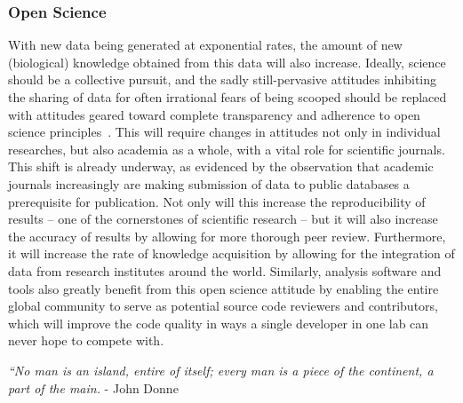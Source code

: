 \subsubsection{Open Science}
With new data being generated at exponential rates, the amount of new (biological) knowledge obtained from this data will also increase.
Ideally, science should be a collective pursuit, and the sadly still-pervasive attitudes inhibiting the sharing of data for often irrational fears of being scooped should be replaced with attitudes geared toward complete transparency and adherence to open science principles~\cite{nosek2015promoting}.
This will require changes in attitudes not only in individual researches, but also academia as a whole, with a vital role for scientific journals.
This shift is already underway, as evidenced by the observation that academic journals increasingly are making submission of data to public databases a prerequisite for publication.
Not only will this increase the reproducibility of results -- one of the cornerstones of scientific research -- but it will also increase the accuracy of results by allowing for more thorough peer review.
Furthermore, it will increase the rate of knowledge acquisition by allowing for the integration of data from research institutes around the world.
Similarly, analysis software and tools also greatly benefit from this open science attitude by enabling the entire global community to serve as potential source code reviewers and contributors, which will improve the code quality in ways a single developer in one lab can never hope to compete with.


\begin{center}
\emph{“No man is an island, entire of itself; every man is a piece of the continent, a part of the main.} - John Donne
\end{center}



